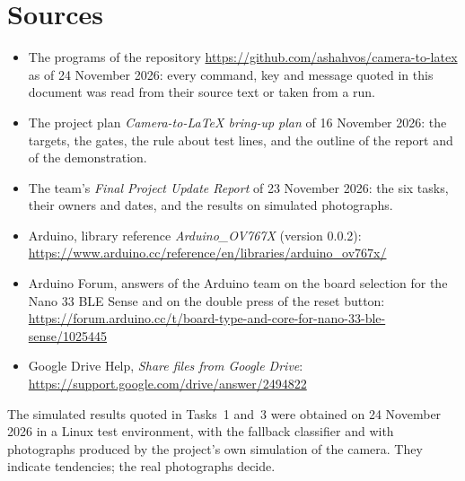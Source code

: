 \section{Sources}

\begin{itemize}
\item The programs of the repository \url{https://github.com/ashahvos/camera-to-latex} as of 24 November 2026: every command, key and
  message quoted in this document was read from their source text or taken from a run.
\item The project plan \emph{Camera-to-\LaTeX{} bring-up plan} of 16 November 2026: the targets,
  the gates, the rule about test lines, and the outline of the report and of the demonstration.
\item The team's \emph{Final Project Update Report} of 23 November 2026: the six tasks, their
  owners and dates, and the results on simulated photographs.
\item Arduino, library reference \emph{Arduino\_OV767X} (version 0.0.2):
  \url{https://www.arduino.cc/reference/en/libraries/arduino_ov767x/}
\item Arduino Forum, answers of the Arduino team on the board selection for the Nano 33 BLE
  Sense and on the double press of the reset button:
  \url{https://forum.arduino.cc/t/board-type-and-core-for-nano-33-ble-sense/1025445}
\item Google Drive Help, \emph{Share files from Google Drive}:
  \url{https://support.google.com/drive/answer/2494822}
\end{itemize}
The simulated results quoted in Tasks~1 and~3 were obtained on 24 November 2026 in a Linux test
environment, with the fallback classifier and with photographs produced by the project's own
simulation of the camera. They indicate tendencies; the real photographs decide.
